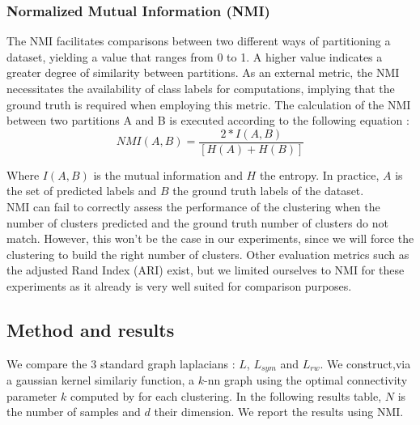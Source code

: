 \documentclass[a4paper,12pt]{article}
\theoremstyle{definition}
\theoremstyle{plain}
\begin{document}
\subsubsection{Normalized Mutual Information (NMI)}
The NMI facilitates comparisons between two different ways of partitioning a dataset, yielding a value that ranges from 0 to 1. A higher value indicates a greater degree of similarity between partitions. As an external metric, the NMI necessitates the availability of class labels for computations, implying that the ground truth is required when employing this metric.
The calculation of the NMI between two partitions A and B is executed according to the following equation :
$$NMI\left(A,B\right)=\frac{2*I(A,B)}{[H\left(A\right)+H(B)]}$$
	
	Where $I(A,B)$ is the mutual information and $H$ the entropy. 
	In practice, $A$ is the set of predicted labels and $B$ the ground truth labels of the dataset. \\ NMI can fail to correctly assess the performance of the clustering when the number of clusters predicted and the ground truth number of clusters do not match. However, this won't be the case in our experiments, since we will force the clustering to build the right number of clusters.
	Other evaluation metrics such as the adjusted Rand Index (ARI) exist, but we limited ourselves to NMI for these experiments as it already is very well suited for comparison purposes.
\subsection{Method and results}
We compare the $3$ standard graph laplacians : $L$, $L_{sym}$ and $L_{rw}$. We construct,via a gaussian kernel similariy function, a $k$-nn graph using the optimal connectivity parameter $k$ computed by \cite[Jonckheere et.al]{GSC} for each clustering. In the following results table, $N$ is the number of samples and $d$ their dimension. We report the results using NMI.
\end{document}
